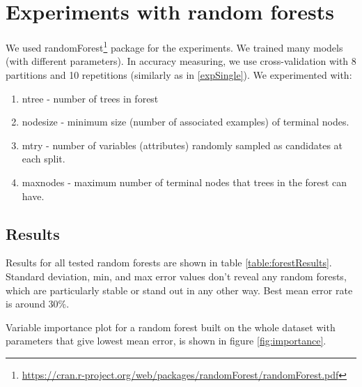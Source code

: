 \documentclass[a4paper]{article}
\begin{document}
\section{Experiments with random forests}
\label{forest}
We used randomForest\footnote{\url{https://cran.r-project.org/web/packages/randomForest/randomForest.pdf}} package for the experiments.
We trained many models (with different parameters).
In accuracy measuring, we use cross-validation with 8 partitions
and 10 repetitions (similarly as in \ref{expSingle}).
We experimented with:
\begin{enumerate}
    \item ntree - number of trees in forest
    \item nodesize - minimum size (number of associated examples) of terminal nodes.
    \item mtry - number of variables (attributes) randomly sampled as candidates at each split.
    \item maxnodes - maximum number of terminal nodes that trees in the forest can have.
\end{enumerate}

\subsection{Results}
\label{singleConc}
Results for all tested random forests are shown in table \ref{table:forestResults}.
Standard deviation, min, and max error values don't reveal any random forests, which are
particularly stable or stand out in any other way.
Best mean error rate is around 30\%.

Variable importance plot for a random forest built on the whole dataset
with parameters that give lowest mean error,
is shown in figure \ref{fig:importance}.
\end{document}
